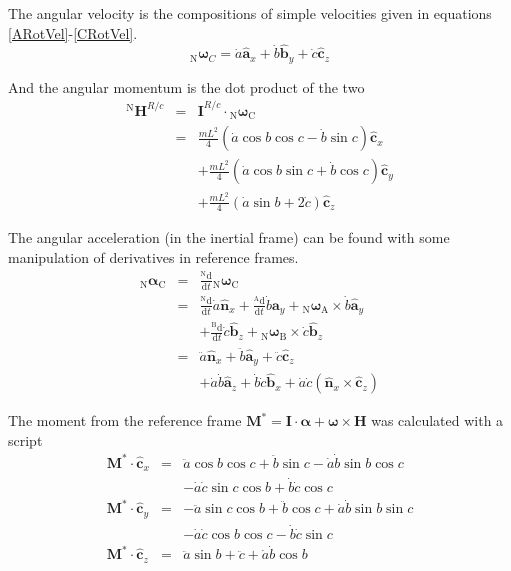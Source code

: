 \documentclass[lettersize,journal]{IEEEtran}
\begin{document}
The angular velocity is the compositions of simple velocities given in equations \ref{ARotVel}-\ref{CRotVel}.
\begin{equation}
  {_\mathrm{N}\boldsymbol\omega_C} = \dot{a}\mathbf{\hat{a}}_x + \dot{b} \mathbf{\hat{b}}_y + \dot{c} \mathbf{\hat{c}}_z
\end{equation}

And the angular momentum is the dot product of the two
\begin{eqnarray}
  {^\mathrm{N}\mathbf{H}^{R/c}} &=& \mathbf{I}^{R/c} \cdot {_\mathrm{N}\boldsymbol\omega_\mathrm{C}}\nonumber\\
  &=&\frac{mL^2}{4}\left(\dot{a} \cos b \cos c - \dot{b} \sin c\right) \mathbf{\hat{c}}_x\nonumber\\
  &&+\frac{mL^2}{4}\left(\dot{a} \cos b \sin c + \dot{b} \cos c\right) \mathbf{\hat{c}}_y\nonumber\\
  &&+\frac{mL^2}{4}\left(\dot{a}\sin b + 2\dot{c}\right) \mathbf{\hat{c}}_z
\end{eqnarray}


The angular acceleration (in the inertial frame) can be found with some manipulation of derivatives in reference frames.
\begin{eqnarray}
  {_\mathrm{N}\boldsymbol\alpha_\mathrm{C}} &=& \frac{^\mathrm{N}\mathrm{d}}{\mathrm{d}t} {_\mathrm{N}\boldsymbol\omega_\mathrm{C}} \nonumber\\
  &=& \frac{^\mathrm{N}\mathrm{d}}{\mathrm{d}t} \dot{a} \mathbf{\hat{n}}_x + \frac{^\mathrm{A}\mathrm{d}}{\mathrm{d}t} \dot{b} \mathbf{a}_y + {_\mathrm{N}\boldsymbol\omega_\mathrm{A}} \times \dot{b} \mathbf{\hat{a}}_y\nonumber\\
  && + \frac{^\mathrm{B}\mathrm{d}}{\mathrm{d} t} \dot{c} \mathbf{\hat{b}}_z + {_\mathrm{N}\boldsymbol\omega_\mathrm{B}} \times \dot{c} \mathbf{\hat{b}}_z \nonumber\\
  &=& \ddot{a}\mathbf{\hat{n}}_x + \ddot{b} \mathbf{\hat{a}}_y + \ddot{c} \mathbf{\hat{c}}_z\nonumber\\
  &&+\dot{a}\dot{b}\mathbf{\hat{a}}_z + \dot{b}\dot{c} \mathbf{\hat{b}}_x + \dot{a}\dot{c} \left(\mathbf{\hat{n}}_x \times \mathbf{\hat{c}}_z\right) 
\end{eqnarray}

The moment from the reference frame $\mathbf{M}^* = \mathbf{I}\cdot \boldsymbol\alpha + \boldsymbol\omega\times \mathbf{H}$ was calculated with a script
\begin{eqnarray}
  \mathbf{M}^* \cdot \mathbf{\hat{c}}_x &=& \ddot{a}\cos b\cos c + \ddot{b}\sin c- \dot{a}\dot{b}\sin b\cos c\nonumber\\
  &&- \dot{a}\dot{c}\sin c\cos b + \dot{b}\dot{c}\cos c\\
  \mathbf{M}^* \cdot \mathbf{\hat{c}}_y &=& - \ddot{a}\sin c\cos b + \ddot{b}\cos c+\dot{a}\dot{b}\sin b\sin c\nonumber\\
  &&- \dot{a}\dot{c}\cos b\cos c - \dot{b}\dot{c}\sin c \\
  \mathbf{M}^* \cdot \mathbf{\hat{c}}_z &=& \ddot{a} \sin b + \ddot{c} +\dot{a} \dot{b} \cos b
\end{eqnarray}
\end{document}
